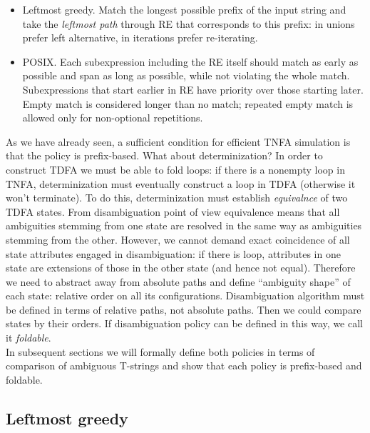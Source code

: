 \documentclass{article}
\theoremstyle{definition}
\begin{document}
\begin{multicols}{2}
\begin{itemize}
    \setlength{\parskip}{0.5em}
    \item Leftmost greedy.
        Match the longest possible prefix of the input string
        and take the \emph{leftmost path} through RE that corresponds to this prefix:
        in unions prefer left alternative, in iterations prefer re-iterating.

    \item POSIX.
        Each subexpression including the RE itself should match as early as possible
        and span as long as possible, while not violating the whole match.
        Subexpressions that start earlier in RE have priority over those starting later.
        Empty match is considered longer than no match;
        repeated empty match is allowed only for non-optional repetitions.
    \\
\end{itemize}

As we have already seen, a sufficient condition for efficient TNFA simulation is that the policy is prefix-based.
What about determinization?
In order to construct TDFA we must be able to fold loops:
if there is a nonempty loop in TNFA, determinization must eventually construct a loop in TDFA
(otherwise it won't terminate).
To do this, determinization must establish \emph{equivalnce} of two TDFA states.
From disambiguation point of view equivalence means that all ambiguities stemming from one state
are resolved in the same way as ambiguities stemming from the other.
However, we cannot demand exact coincidence of all state attributes engaged in disambiguation:
if there is loop, attributes in one state are extensions of those in the other state (and hence not equal).
Therefore we need to abstract away from absolute paths and define ``ambiguity shape'' of each state: relative order on all its configurations.
Disambiguation algorithm must be defined in terms of relative paths, not absolute paths.
Then we could compare states by their orders.
If disambiguation policy can be defined in this way, we call it \emph{foldable}.
\\

In subsequent sections we will formally define both policies in terms of comparison of ambiguous T-strings
and show that each policy is prefix-based and foldable.

\subsection{Leftmost greedy}


\end{multicols}
\end{document}

